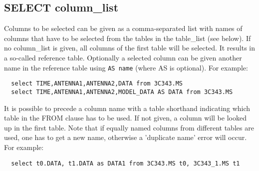 \subsection{\label{TAQL:COLUMNLIST}SELECT column\_list}
Columns to be selected can be given as
a comma-separated list with names of columns that have to be
selected from the tables in the table\_list (see below).
If no column\_list is given, all columns of the first table will be selected.
It results in a so-called reference table. Optionally a
selected column can be given another name in the reference
table using \texttt{AS name} (where AS is optional).
For example:
\begin{verbatim}
  select TIME,ANTENNA1,ANTENNA2,DATA from 3C343.MS
  select TIME,ANTENNA1,ANTENNA2,MODEL_DATA AS DATA from 3C343.MS
\end{verbatim}
It is possible to precede a column name with a table shorthand
indicating which table in the FROM clause has to be used. If not
given, a column will be looked up in the first table. Note that if
equally named columns from different tables are used, one has to get a
new name, otherwise a 'duplicate name' error will occur.
For example:
\begin{verbatim}
  select t0.DATA, t1.DATA as DATA1 from 3C343.MS t0, 3C343_1.MS t1
\end{verbatim}

